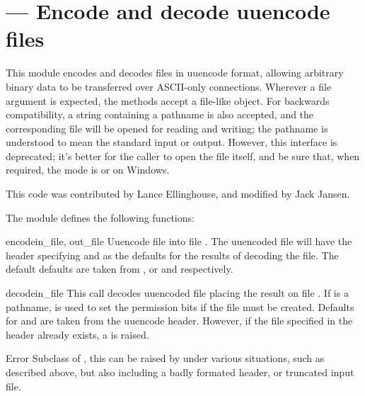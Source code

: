 \section{ ---
         Encode and decode uuencode files}



This module encodes and decodes files in uuencode format, allowing
arbitrary binary data to be transferred over ASCII-only connections.
Wherever a file argument is expected, the methods accept a file-like
object.  For backwards compatibility, a string containing a pathname
is also accepted, and the corresponding file will be opened for
reading and writing; the pathname  is understood to mean the
standard input or output.  However, this interface is deprecated; it's
better for the caller to open the file itself, and be sure that, when
required, the mode is  or  on Windows.

This code was contributed by Lance Ellinghouse, and modified by Jack
Jansen.

The  module defines the following functions:

\begin{funcdesc}{encode}{in_file, out_file}
  Uuencode file  into file .  The uuencoded
  file will have the header specifying  and  as
  the defaults for the results of decoding the file. The default
  defaults are taken from , or  and 
  respectively.
\end{funcdesc}

\begin{funcdesc}{decode}{in_file}
  This call decodes uuencoded file  placing the result on
  file . If  is a pathname,  is
  used to set the permission bits if the file must be
  created. Defaults for  and  are taken from
  the uuencode header.  However, if the file specified in the header
  already exists, a  is raised.
\end{funcdesc}

\begin{excclassdesc}{Error}{}
  Subclass of , this can be raised by
   under various situations, such as described
  above, but also including a badly formated header, or truncated
  input file.
\end{excclassdesc}

\begin{seealso}
\end{seealso}
